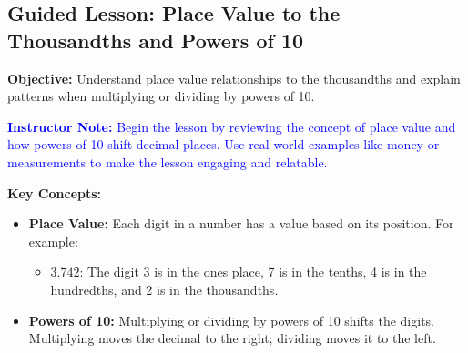 \documentclass[12pt]{article}
\title{}
\date{}
\begin{document}
\subsection*{Guided Lesson: Place Value to the Thousandths and Powers of 10}
\onehalfspacing

\begin{tcolorbox}[colframe=black!40, colback=gray!5,
coltitle=black, colbacktitle=black!20, fonttitle=\bfseries\Large,
title=Learning Objective, halign title=center, left=5pt, right=5pt, top=5pt, bottom=15pt]
\textbf{Objective:} Understand place value relationships to the thousandths and explain patterns when multiplying or dividing by powers of 10.

\textcolor{blue}{\textbf{Instructor Note:} Begin the lesson by reviewing the concept of place value and how powers of 10 shift decimal places. Use real-world examples like money or measurements to make the lesson engaging and relatable.}
\end{tcolorbox}

\vspace{1em}

\begin{tcolorbox}[colframe=black!60, colback=white,
coltitle=black, colbacktitle=black!15, fonttitle=\bfseries\Large,
title=Key Concepts and Vocabulary, halign title=center, left=10pt, right=10pt, top=10pt, bottom=15pt]
\textbf{Key Concepts:}
\begin{itemize}
    \item \textbf{Place Value:} Each digit in a number has a value based on its position. For example:
    \begin{itemize}
        \item \(3.742\): The digit 3 is in the ones place, 7 is in the tenths, 4 is in the hundredths, and 2 is in the thousandths.
    \end{itemize}
    \item \textbf{Powers of 10:} Multiplying or dividing by powers of 10 shifts the digits. Multiplying moves the decimal to the right; dividing moves it to the left.
\end{itemize}
\end{tcolorbox}

\vspace{1em}
\end{document}
